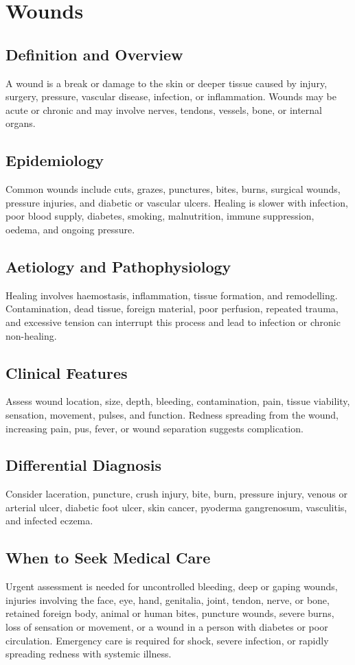 \chapter{Wounds}
\section*{Definition and Overview}
A wound is a break or damage to the skin or deeper tissue caused by injury, surgery, pressure, vascular disease, infection, or inflammation. Wounds may be acute or chronic and may involve nerves, tendons, vessels, bone, or internal organs.
\section*{Epidemiology}
Common wounds include cuts, grazes, punctures, bites, burns, surgical wounds, pressure injuries, and diabetic or vascular ulcers. Healing is slower with infection, poor blood supply, diabetes, smoking, malnutrition, immune suppression, oedema, and ongoing pressure.
\section*{Aetiology and Pathophysiology}
Healing involves haemostasis, inflammation, tissue formation, and remodelling. Contamination, dead tissue, foreign material, poor perfusion, repeated trauma, and excessive tension can interrupt this process and lead to infection or chronic non-healing.
\section*{Clinical Features}
Assess wound location, size, depth, bleeding, contamination, pain, tissue viability, sensation, movement, pulses, and function. Redness spreading from the wound, increasing pain, pus, fever, or wound separation suggests complication.
\section*{Differential Diagnosis}
Consider laceration, puncture, crush injury, bite, burn, pressure injury, venous or arterial ulcer, diabetic foot ulcer, skin cancer, pyoderma gangrenosum, vasculitis, and infected eczema.
\section*{When to Seek Medical Care}
Urgent assessment is needed for uncontrolled bleeding, deep or gaping wounds, injuries involving the face, eye, hand, genitalia, joint, tendon, nerve, or bone, retained foreign body, animal or human bites, puncture wounds, severe burns, loss of sensation or movement, or a wound in a person with diabetes or poor circulation. Emergency care is required for shock, severe infection, or rapidly spreading redness with systemic illness.
